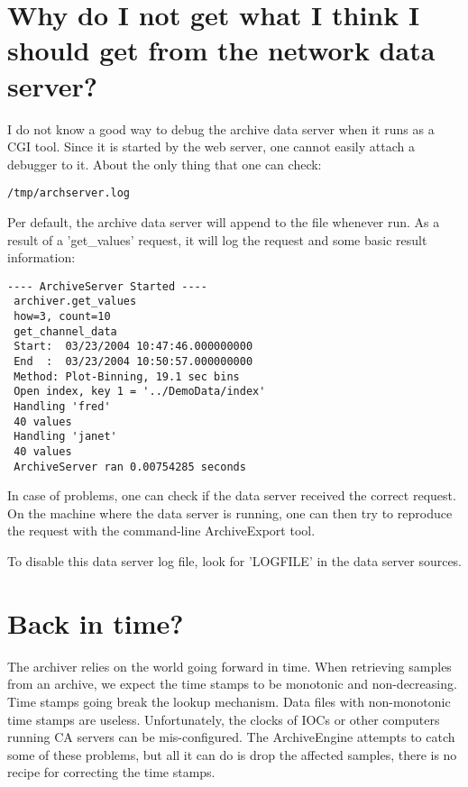 \section{Why do I not get what I think I should get from the network data server?}
I do not know a good way to debug the archive data server when it runs
as a CGI tool. Since it is started by the web server, one cannot easily
attach a debugger to it.
About the only thing that one can check:
\begin{lstlisting}[keywordstyle=\sffamily]
   /tmp/archserver.log
\end{lstlisting}

\noindent Per default, the archive data server will append to the
 file whenever run. As a result of a
'get\_values' request, it will log the request and some basic result
information:
\begin{lstlisting}[keywordstyle=\sffamily]
 ---- ArchiveServer Started ----
 archiver.get_values
 how=3, count=10
 get_channel_data
 Start:  03/23/2004 10:47:46.000000000
 End  :  03/23/2004 10:50:57.000000000
 Method: Plot-Binning, 19.1 sec bins
 Open index, key 1 = '../DemoData/index'
 Handling 'fred'
 40 values
 Handling 'janet'
 40 values
 ArchiveServer ran 0.00754285 seconds
\end{lstlisting}

\noindent In case of problems, one can check if the data server received the
correct request. On the machine where the data server is running,
one can then try to reproduce the request with the command-line
ArchiveExport tool.

To disable this data server log file, look for 'LOGFILE' in the data
server sources.

\section{Back in time?} \label{sec:back-in-timefaq} 
The archiver relies on the world going forward in time. When
retrieving samples from an archive, we expect the time stamps to be
monotonic and non-decreasing. Time stamps going  break the
lookup mechanism. Data files with non-monotonic time stamps are
useless. Unfortunately, the clocks of IOCs or other computers running
CA servers can be mis-configured. The ArchiveEngine attempts to catch
some of these problems, but all it can do is drop the affected
samples, there is no recipe for correcting the time stamps.

